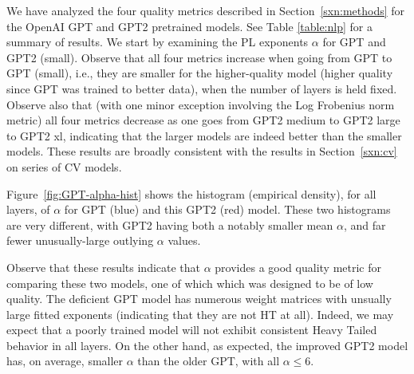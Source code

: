 We have analyzed the four quality metrics described in Section~\ref{sxn:methods} for the OpenAI GPT and GPT2 pretrained models.
See Table \ref{table:nlp} for a summary of results.
We start by examining the PL exponents $\alpha$ for GPT and GPT2 (small).
Observe that all four metrics increase when going from GPT to GPT (small), i.e., they are smaller for the higher-quality model (higher quality since GPT was trained to better data), when the number of layers is held fixed.
Observe also that (with one minor exception involving the Log Frobenius norm metric) all four metrics decrease as one goes from GPT2 medium to GPT2 large to GPT2 xl, indicating that the larger models are indeed better than the smaller models.
These results are broadly consistent with the results in Section~\ref{sxn:cv} on series of CV models. 

Figure~\ref{fig:GPT-alpha-hist} shows the histogram (empirical density), for all layers, of $\alpha$ for GPT (blue) and this GPT2 (red) model.  
These two histograms are very different, with GPT2 having both a notably smaller mean $\alpha$, and far fewer unusually-large outlying $\alpha$ values.

Observe that these results indicate that $\alpha$ provides a good quality metric for comparing these two models, one of which which was designed to be of low quality.
The deficient GPT model has numerous weight matrices with unsually large fitted exponents (indicating that they are not HT at all).  
Indeed, we may expect that a poorly trained model will not exhibit consistent Heavy Tailed behavior in all layers.
On the other hand, as expected, the improved GPT2 model has, on average, smaller $\alpha$ than the older GPT, with all $\alpha\le6$.  


